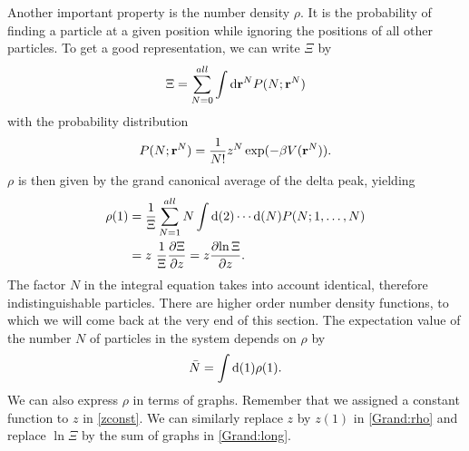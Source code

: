 \documentclass[8.5pt,twoside,twocolumn]{article}
\newcommand\di{\te{d}}
\newcommand\dr{\di\r}
\renewcommand\r{\bo r}
\theoremstyle{standard}
\begin{document}
Another important property is the number density $\rho$. It is the probability
of finding a particle at a given position while ignoring the positions of all
other particles. To get a good representation, we can write $\Xi$ by
\begin{equation}
\Xi = \sum_{N=0}^\infty \int\dr^N P(N;\r^N)
\label{Grand:DifferentXi} 
\end{equation}  
with the probability distribution
\begin{equation}
P(N;\r^N) = \frac 1 {N!} z^N \exp(-\be V(\r^N)). 
\end{equation}
$\rho$ is then given by the grand canonical average of the delta peak, yielding
\begin{equation}
\begin{aligned}
\rho(1) %
&=\frac 1 \Xi \sum_{N=1}^\infty N \int\di(2)\cdots\di(N) P(N;1,\ldots,N) \\
&= z \ \frac 1 \Xi \deri \Xi z = z \deri {\ln \Xi} z.
\end{aligned}
\label{Grand:rho}
\end{equation}
The factor $N$ in the integral equation takes into account identical,
therefore indistinguishable particles.
There are higher order number density functions, to which we will come back at the very end of this section. The 
expectation value of the number $N$ of particles in the system depends on $\rho$ by
\begin{equation}
\bar N = \int \di(1) \rho(1).
\label{Nbyrho}
\end{equation}
We can also express $\rho$ in terms of graphs. Remember that we assigned a constant function to $z$ in \eqref{zconst}.
We can similarly replace $z$ by $z(1)$ in \eqref{Grand:rho} and replace $\ln \Xi$ by the sum of graphs in \eqref{Grand:long}.
\end{document}
